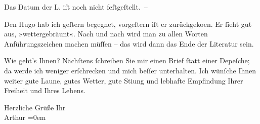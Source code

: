 \pstart
           Das Datum der L. iſt noch nicht
               feſtgeſtellt. –\pend
           
\pstart
           Den Hugo hab ich geſtern begegnet, vorgeſtern
               iſt er zurückgeko{\geminationm}en. Er ſieht gut aus,
               »wettergebräunt«. Nach und nach wird man zu allen Worten Anführungszeichen {\pb}machen müſſen – das wird dann das Ende der Literatur
               sein.\pend
           
\pstart
           Wie geht’s Ihnen? Nächſtens ſchreiben Sie mir einen Brief ſtatt einer Depeſche; da
               werde ich weniger erſchrecken und mich beſſer unterhalten. Ich wünſche Ihnen weiter
               gute Laune, {\pb}gutes Wetter, gute Sti{\geminationm}ung und lebhafte Empfindung Ihrer Freiheit und Ihres
               Lebens.\pend
           
\pstart
           Herzliche Grüße Ihr{\\[\baselineskip]}\spacefill\mbox{Arthur}\pend
           \leftskip=0em{}\endnumbering{}  
      